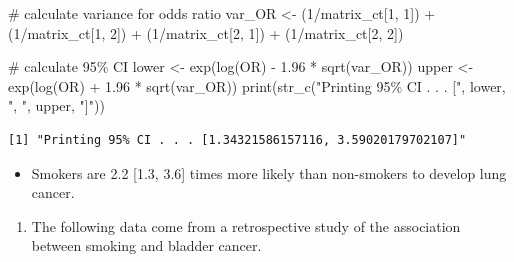 \documentclass[
  letterpaper,
  DIV=11,
  numbers=noendperiod]{scrartcl}
\newenvironment{Shaded}{\begin{snugshade}}{\end{snugshade}}
\newcommand{\CommentTok}[1]{\textcolor[rgb]{0.37,0.37,0.37}{#1}}
\newcommand{\DecValTok}[1]{\textcolor[rgb]{0.68,0.00,0.00}{#1}}
\newcommand{\FloatTok}[1]{\textcolor[rgb]{0.68,0.00,0.00}{#1}}
\newcommand{\FunctionTok}[1]{\textcolor[rgb]{0.28,0.35,0.67}{#1}}
\newcommand{\NormalTok}[1]{\textcolor[rgb]{0.00,0.23,0.31}{#1}}
\newcommand{\OtherTok}[1]{\textcolor[rgb]{0.00,0.23,0.31}{#1}}
\newcommand{\SpecialCharTok}[1]{\textcolor[rgb]{0.37,0.37,0.37}{#1}}
\newcommand{\StringTok}[1]{\textcolor[rgb]{0.13,0.47,0.30}{#1}}
\providecommand{\tightlist}{%
  \setlength{\itemsep}{0pt}\setlength{\parskip}{0pt}}\usepackage{longtable,booktabs,array}
\begin{document}
\begin{Shaded}
\begin{Highlighting}[]
\CommentTok{\# calculate variance for odds ratio}
\NormalTok{var\_OR }\OtherTok{\textless{}{-}}\NormalTok{ (}\DecValTok{1}\SpecialCharTok{/}\NormalTok{matrix\_ct[}\DecValTok{1}\NormalTok{, }\DecValTok{1}\NormalTok{]) }\SpecialCharTok{+}\NormalTok{ (}\DecValTok{1}\SpecialCharTok{/}\NormalTok{matrix\_ct[}\DecValTok{1}\NormalTok{, }\DecValTok{2}\NormalTok{]) }\SpecialCharTok{+}
\NormalTok{(}\DecValTok{1}\SpecialCharTok{/}\NormalTok{matrix\_ct[}\DecValTok{2}\NormalTok{, }\DecValTok{1}\NormalTok{]) }\SpecialCharTok{+}\NormalTok{ (}\DecValTok{1}\SpecialCharTok{/}\NormalTok{matrix\_ct[}\DecValTok{2}\NormalTok{, }\DecValTok{2}\NormalTok{])}

\CommentTok{\# calculate 95\% CI}
\NormalTok{lower }\OtherTok{\textless{}{-}} \FunctionTok{exp}\NormalTok{(}\FunctionTok{log}\NormalTok{(OR) }\SpecialCharTok{{-}} \FloatTok{1.96} \SpecialCharTok{*} \FunctionTok{sqrt}\NormalTok{(var\_OR))}
\NormalTok{upper }\OtherTok{\textless{}{-}} \FunctionTok{exp}\NormalTok{(}\FunctionTok{log}\NormalTok{(OR) }\SpecialCharTok{+} \FloatTok{1.96} \SpecialCharTok{*} \FunctionTok{sqrt}\NormalTok{(var\_OR))}
\FunctionTok{print}\NormalTok{(}\FunctionTok{str\_c}\NormalTok{(}\StringTok{"Printing 95\% CI . . . ["}\NormalTok{, lower, }\StringTok{", "}\NormalTok{, upper, }\StringTok{"]"}\NormalTok{)) }
\end{Highlighting}
\end{Shaded}

\begin{verbatim}
[1] "Printing 95% CI . . . [1.34321586157116, 3.59020179702107]"
\end{verbatim}

\begin{itemize}
\tightlist
\item
  Smokers are 2.2 {[}1.3, 3.6{]} times more likely than non-smokers to
  develop lung cancer.
\end{itemize}

\newpage

\begin{enumerate}
\def\labelenumi{\arabic{enumi}.}
\setcounter{enumi}{1}
\tightlist
\item
  The following data come from a retrospective study of the association
  between smoking and bladder cancer.
\end{enumerate}
\end{document}
